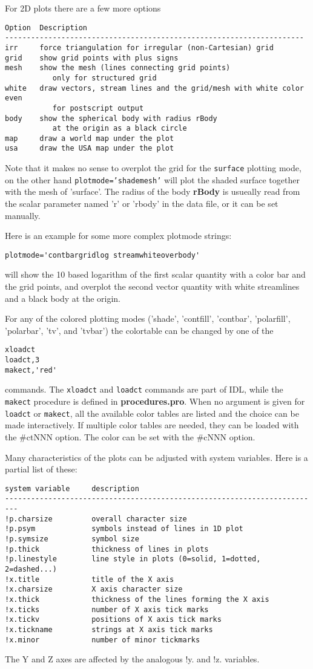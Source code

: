 \documentclass{article}
\begin{document}
For 2D plots there are a few more options
\begin{verbatim}
Option  Description
---------------------------------------------------------------------
irr     force triangulation for irregular (non-Cartesian) grid
grid    show grid points with plus signs
mesh    show the mesh (lines connecting grid points) 
           only for structured grid
white   draw vectors, stream lines and the grid/mesh with white color even 
           for postscript output
body    show the spherical body with radius rBody 
           at the origin as a black circle
map     draw a world map under the plot
usa     draw the USA map under the plot
\end{verbatim}
Note that it makes no sense to overplot the grid for the 
{\tt surface} plotting mode, on the other hand {\tt plotmode='shademesh'}
will plot the shaded surface together with the mesh of 'surface'.
The radius of the body {\bf rBody} is usueally read from the 
scalar parameter named 'r' or 'rbody' in the data file, or it can be set
manually.

Here is an example for some more complex plotmode strings:
\begin{verbatim}
plotmode='contbargridlog streamwhiteoverbody'
\end{verbatim} 
will show the 10 based logarithm of the first scalar quantity with 
a color bar and the grid points, 
and overplot the second vector quantity with white streamlines
and a black body at the origin.

For any of the colored plotting modes ('shade', 'contfill', 'contbar', 
'polarfill', 'polarbar', 'tv', and 'tvbar') the colortable can be 
changed by one of the 
\begin{verbatim}
xloadct
loadct,3
makect,'red'
\end{verbatim}
commands. The {\tt xloadct} and {\tt loadct} commands are part of IDL, while
the {\tt makect} procedure is defined in {\bf procedures.pro}.
When no argument is given for {\tt loadct} or {\tt makect}, 
all the available color tables are listed
and the choice can be made interactively.
If multiple color tables are needed, they can be loaded with the \#ctNNN
option. The color can be set with the \#cNNN option. 

Many characteristics of the plots can be adjusted with system variables.
Here is a partial list of these:
\begin{verbatim}
system variable     description
-------------------------------------------------------------------------
!p.charsize         overall character size
!p.psym             symbols instead of lines in 1D plot
!p.symsize          symbol size
!p.thick            thickness of lines in plots
!p.linestyle        line style in plots (0=solid, 1=dotted, 2=dashed...)
!x.title            title of the X axis
!x.charsize         X axis character size
!x.thick            thickness of the lines forming the X axis
!x.ticks            number of X axis tick marks
!x.tickv            positions of X axis tick marks
!x.tickname         strings at X axis tick marks
!x.minor            number of minor tickmarks
\end{verbatim}
The Y and Z axes are affected by the analogous !y. and !z. variables.
\end{document}
